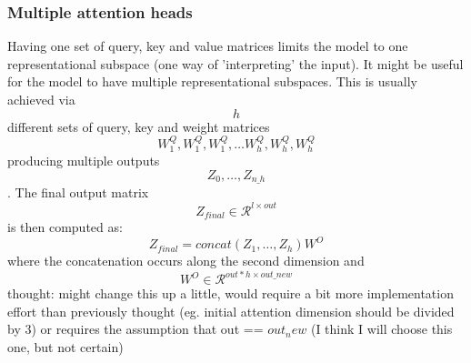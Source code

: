\subsubsection{Multiple attention heads}
Having one set of query, key and value matrices limits the model to one representational subspace (one way of 'interpreting' the input). It might be useful for the model to have multiple representational subspaces. This is usually achieved via $$h$$ different sets of query, key and weight matrices $$W^Q_1, W^Q_1, W^Q_1, \dots W^Q_{h}, W^Q_{h},W^Q_{h}$$ producing multiple outputs $$Z_0, \dots, Z_{n\_h}$$.
The final output matrix $$Z_{final} \in \mathcal{R}^{l \times out}$$ is then computed as:
$$Z_{final} = concat(Z_1, \dots, Z_{h}) W^O$$
where the concatenation occurs along the second dimension and $$W^O \in \mathcal{R}^{out * h \times out\_new}$$
thought: might change this up a little, would require a bit more implementation effort than previously thought (eg. initial attention dimension should be divided by 3) or requires the assumption that out == $out_new$ (I think I will choose this one, but not certain)
